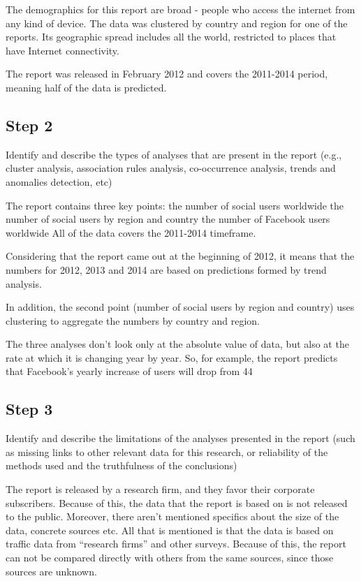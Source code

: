 \documentclass{acm_proc_10ptArticle-sp}
\begin{document}
The demographics for this report are broad - people who access the internet from any kind of device. The data was clustered by country and region for one of the reports. Its geographic spread includes all the world, restricted to places that have Internet connectivity.

The report was released in February 2012 and covers the 2011-2014 period, meaning half of the data is predicted.


\subsection{Step 2}

Identify and describe the types of analyses that are present in the report (e.g., cluster analysis, association rules analysis, co-occurrence analysis, trends and anomalies detection, etc)

The report contains three key points:
the number of social users worldwide
the number of social users by region and country
the number of Facebook users worldwide
All of the data covers the 2011-2014 timeframe.

Considering that the report came out at the beginning of 2012, it means that the numbers for 2012, 2013 and 2014 are based on predictions formed by trend analysis.

In addition, the second point (number of social users by region and country) uses clustering to aggregate the numbers by country and region.

The three analyses don’t look only at the absolute value of data, but also at the rate at which it is changing year by year. So, for example, the report predicts that Facebook’s yearly increase of users will drop from 44%


\subsection{Step 3}
 
Identify and describe the limitations of the analyses presented in the report (such as missing links to other relevant data for this research, or reliability of the methods used and the truthfulness of the conclusions)

The report is released by a research firm, and they favor their corporate subscribers. Because of this, the data that the report is based on is not released to the public. Moreover, there aren’t mentioned specifics about the size of the data, concrete sources etc. All that is mentioned is that the data is based on traffic data from “research firms” and other surveys. Because of this, the report can not be compared directly with others from the same sources, since those sources are unknown.
\end{document}
